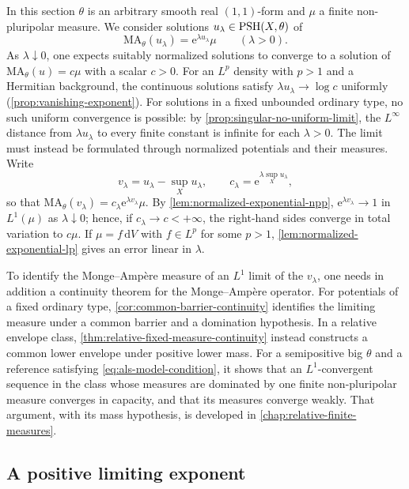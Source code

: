 In this section $\theta$ is an arbitrary smooth real $(1,1)$-form and $\mu$ a finite non-pluripolar measure. We consider solutions $u_\lambda\in\mathrm{PSH}(X,\theta)$ of
\[
 \mathrm{MA}_\theta(u_\lambda)=\mathrm{e}^{\lambda u_\lambda}\mu\qquad(\lambda>0).
\]
As $\lambda\downarrow0$, one expects suitably normalized solutions to converge to a solution of $\mathrm{MA}_\theta(u)=c\mu$ with a scalar $c>0$. For an $L^p$ density with $p>1$ and a Hermitian background, the continuous solutions satisfy $\lambda u_\lambda\to\log c$ uniformly (\cref{prop:vanishing-exponent}). For solutions in a fixed unbounded ordinary type, no such uniform convergence is possible: by \cref{prop:singular-no-uniform-limit}, the $L^\infty$ distance from $\lambda u_\lambda$ to every finite constant is infinite for each $\lambda>0$. The limit must instead be formulated through normalized potentials and their measures. Write
\[
 v_\lambda=u_\lambda-\sup_Xu_\lambda,\qquad
 c_\lambda=\mathrm{e}^{\lambda\sup_Xu_\lambda},
\]
so that $\mathrm{MA}_\theta(v_\lambda)=c_\lambda\mathrm{e}^{\lambda v_\lambda}\mu$. By \cref{lem:normalized-exponential-npp}, $\mathrm{e}^{\lambda v_\lambda}\to1$ in $L^1(\mu)$ as $\lambda\downarrow0$; hence, if $c_\lambda\to c<+\infty$, the right-hand sides converge in total variation to $c\mu$. If $\mu=f\,\mathrm{d}V$ with $f\in L^p$ for some $p>1$, \cref{lem:normalized-exponential-lp} gives an error linear in $\lambda$.

To identify the Monge--Amp\`ere measure of an $L^1$ limit of the $v_\lambda$, one needs in addition a continuity theorem for the Monge--Amp\`ere operator. For potentials of a fixed ordinary type, \cref{cor:common-barrier-continuity} identifies the limiting measure under a common barrier and a domination hypothesis. In a relative envelope class, \cref{thm:relative-fixed-measure-continuity} instead constructs a common lower envelope under positive lower mass. For a semipositive big $\theta$ and a reference satisfying \eqref{eq:als-model-condition}, it shows that an $L^1$-convergent sequence in the class whose measures are dominated by one finite non-pluripolar measure converges in capacity, and that its measures converge weakly. That argument, with its mass hypothesis, is developed in \cref{chap:relative-finite-measures}.

\subsection{A positive limiting exponent}
\label{sec:exponential-closedness}

